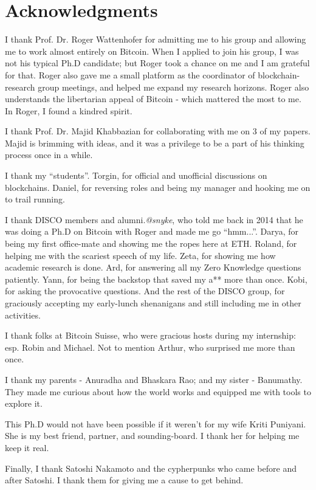 \chapter*{Acknowledgments}

I thank Prof. Dr. Roger Wattenhofer for admitting me to his group and allowing me to work almost entirely on Bitcoin. When I applied to join his group, I was not his typical Ph.D candidate; but Roger took a chance on me and I am grateful for that. Roger also gave me a small platform as the coordinator of blockchain-research group meetings, and helped me expand my research horizons. Roger also understands the libertarian appeal of Bitcoin - which mattered the most to me. In Roger, I found a kindred spirit. 

I thank Prof. Dr. Majid Khabbazian for collaborating with me on 3 of my papers. Majid is brimming with ideas, and it was a privilege to be a part of his thinking process once in a while.

I thank my ``students''. Torgin, for official and unofficial discussions on blockchains. Daniel, for reversing roles and being my manager and hooking me on to trail running. 

I thank DISCO members and alumni.\textit{@snyke}, who told me back in 2014 that he was doing a Ph.D on Bitcoin with Roger and made me go ``hmm...''. Darya, for being my first office-mate and showing me the ropes here at ETH. Roland, for helping me with the scariest speech of my life. Zeta, for showing me how academic research is done. Ard, for answering all my Zero Knowledge questions patiently. Yann, for being the backstop that saved my a** more than once. Kobi, for asking the provocative questions. And the rest of the DISCO group, for graciously accepting my early-lunch shenanigans and still including me in other activities.

I thank folks at Bitcoin Suisse, who were gracious hosts during my internship: esp. Robin and Michael. Not to mention Arthur, who surprised me more than once.

I thank my parents - Anuradha and Bhaskara Rao; and my sister - Banumathy. They made me curious about how the world works and equipped me with tools to explore it. 

This Ph.D would not have been possible if it weren't for my wife Kriti Puniyani. She is my best friend, partner, and sounding-board. I thank her for helping me keep it real.

Finally, I thank Satoshi Nakamoto and the cypherpunks who came before and after Satoshi. I thank them for giving me a cause \cite{bitcoin_whitepaper} to get behind.

